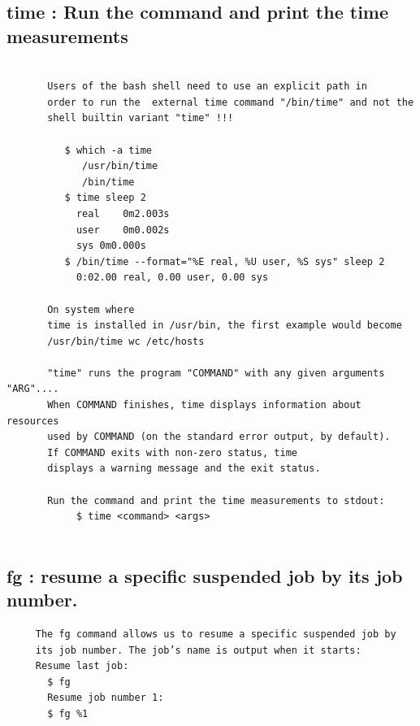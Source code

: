 \documentclass[a4paper,12pt]{article}
\begin{document}
\subsection{time   : Run the command and print the time measurements  }
\begin{verbatim}

       Users of the bash shell need to use an explicit path in 
       order to run the  external time command "/bin/time" and not the 
       shell builtin variant "time" !!! 
          
          $ which -a time
             /usr/bin/time
             /bin/time
          $ time sleep 2
            real	0m2.003s
            user	0m0.002s
            sys	0m0.000s
          $ /bin/time --format="%E real, %U user, %S sys" sleep 2                                     
            0:02.00 real, 0.00 user, 0.00 sys     

       On system where
       time is installed in /usr/bin, the first example would become
       /usr/bin/time wc /etc/hosts        
       
       "time" runs the program "COMMAND" with any given arguments "ARG"....
       When COMMAND finishes, time displays information about resources
       used by COMMAND (on the standard error output, by default).
       If COMMAND exits with non-zero status, time
       displays a warning message and the exit status.
   
       Run the command and print the time measurements to stdout:
            $ time <command> <args>
   
\end{verbatim}


\subsection{fg   : resume a specific suspended job by its job number.  }
\begin{verbatim}
     The fg command allows us to resume a specific suspended job by
     its job number. The job’s name is output when it starts:
     Resume last job:
       $ fg 
       Resume job number 1:
       $ fg %1
\end{verbatim}
\end{document}
